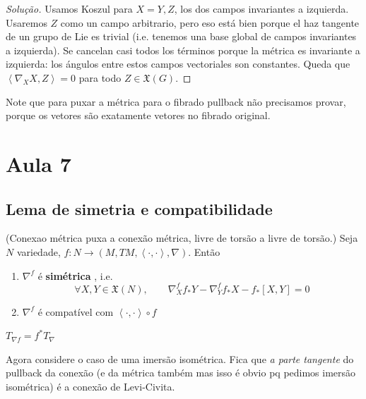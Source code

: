 \begin{proof}[Solução]\leavevmode
	Usamos Koszul para \(X=Y,Z\), los dos campos invariantes a izquierda. Usaremos \(Z\) como un campo arbitrario, pero eso está bien porque el haz tangente de un grupo de Lie es trivial (i.e. tenemos una base global de campos invariantes a izquierda). Se cancelan casi todos los términos porque la métrica es invariante a izquierda: los ángulos entre estos campos vectoriales son constantes. Queda que \(\left<\nabla_XX,Z\right>=0\) para todo \(Z \in \mathfrak{X}(G)\).
\end{proof}
\begin{remark}\leavevmode
Note que para puxar a métrica para o fibrado pullback não precisamos provar, porque os vetores são exatamente vetores no fibrado original.
\end{remark}

\section{Aula 7}

\subsection{Lema de simetria e compatibilidade}

\begin{lemma}\leavevmode
	(Conexao métrica puxa a conexão métrica, livre de torsão a livre de torsão.) Seja \(N\) variedade, \(f:N \to (M,TM,\left<\cdot,\cdot\right>,\nabla)\). Então
	\begin{enumerate}
	\item \(\nabla^f\) é \textbf{simétrica} , i.e.
		\[\forall X,Y \in \mathfrak{X}(N),\qquad \nabla^f_X f_*Y-\nabla^f_Y f_*X-f_*[X,Y]=0\]
	\item \(\nabla^f\) é compatível com \(\left<\cdot,\cdot\right> \circ f\)
	\end{enumerate}
	\begin{exercise}\leavevmode
		\(T_{\nabla f}=f^* T_\nabla\) 
	\end{exercise}
\end{lemma}

\begin{example}\leavevmode
Agora considere o caso de uma imersão isométrica. Fica que \textit{a parte tangente} do pullback da conexão (e da métrica também mas isso é obvio pq pedimos imersão isométrica) é a conexão de Levi-Civita.
\end{example}

